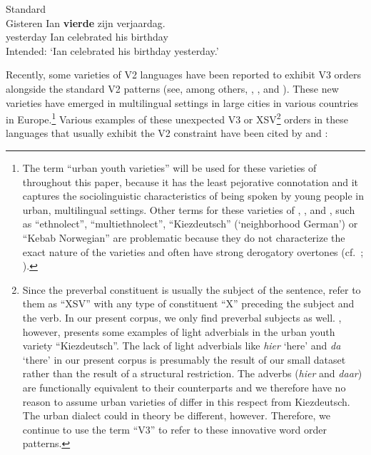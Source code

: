 \documentclass[output=paper]{langsci/langscibook}
\begin{document}
\begin{exe}                   %
\ex\label{exV3} Standard \\
    \gll \llap{*}Gisteren Ian \textbf{vierde} zijn verjaardag.\\
yesterday Ian celebrated his birthday\\
\trans Intended: `Ian celebrated his birthday yesterday.'
\end{exe}                     %

\noindent Recently, some varieties of  V2 languages have been reported
to exhibit V3 orders alongside the standard V2 patterns (see, among others,
\citealt{Freywaldetal:2015}, \citealt{Wiese:2013}, \citealt{WieseRehbein:2016}
and \citealt{Walkden:2017}). These new  varieties have emerged in
multilingual settings in large cities in various countries in
Europe.\footnote{The term \enquote{urban youth varieties} will be used for
    these varieties of  throughout this paper, because it has the least
    pejorative connotation and it captures the sociolinguistic characteristics
    of being spoken by young people in urban, multilingual settings. Other
    terms for these varieties of , , 
    and , such as
    \enquote{ethnolect}, \enquote{multiethnolect}, \enquote{Kiezdeutsch} (`neighborhood German') or
    \enquote{Kebab Norwegian} are problematic because they do not characterize the
    exact nature of the varieties and often have strong derogatory overtones
    (cf.\ \citealt{Walkden:2017}; \citealt{Aarsaether:2010}).} Various examples
    of these unexpected V3 or XSV\footnote{Since the preverbal constituent is
        usually the subject of the sentence, \citet{Freywaldetal:2015} refer to
        them as \enquote{XSV} with any type of constituent \enquote{X}
        preceding the subject and the verb. In our present corpus, we only find
        preverbal subjects as well.  \citet{Walkden:2017}, however, presents
        some examples of light adverbials in the  urban youth variety
        \enquote{Kiezdeutsch}. The lack of light adverbials like \emph{hier} `here' and
        \emph{da} `there' in our present corpus is presumably the result of our
        small dataset rather than the result of a structural restriction. The
         adverbs (\emph{hier} and \emph{daar}) are functionally equivalent
        to their  counterparts and we therefore have no reason to assume
    urban varieties of  differ in this respect from Kiezdeutsch. The 
urban dialect could in theory be different, however. Therefore, we continue to
use the term \enquote{V3} to refer to these innovative word order patterns.}
orders in these languages that usually exhibit the V2 constraint have been
cited by \citet{Freywaldetal:2015} and \citet{Walkden:2017}:
\end{document}
